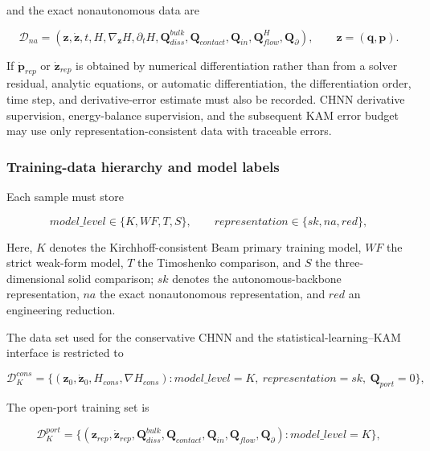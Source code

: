and the exact nonautonomous data are

\begin{equation}
\label{eq:galerkin-2-122}
\mathcal{D}_{na} = \left( \mathbf{z},\dot{\mathbf{z}},t,H,\nabla_{\mathbf{z}}H,\partial_{t}H,\mathbf{Q}_{diss}^{bulk},\mathbf{Q}_{contact},\mathbf{Q}_{in},\mathbf{Q}_{flow}^{H},\mathbf{Q}_{\partial} \right),\quad\quad\mathbf{z} = \left( \mathbf{q},\mathbf{p} \right).
\end{equation}

If \({\dot{\mathbf{p}}}_{rep}\) or \({\dot{\mathbf{z}}}_{rep}\) is obtained by numerical differentiation rather than from a solver residual, analytic equations, or automatic differentiation, the differentiation order, time step, and derivative-error estimate must also be recorded. CHNN derivative supervision, energy-balance supervision, and the subsequent KAM error budget may use only representation-consistent data with traceable errors.

\subsubsection{Training-data hierarchy and model labels}\label{sec:galerkin-2-11-3}

Each sample must store

\begin{equation}
\label{eq:galerkin-2-123}
model\_ level \in \{ K,WF,T,S\},\quad\quad representation \in \{ sk,na,red\},
\end{equation}

Here, \(K\) denotes the Kirchhoff-consistent Beam primary training model, \(WF\) the strict weak-form model, \(T\) the Timoshenko comparison, and \(S\) the three-dimensional solid comparison; \(sk\) denotes the autonomous-backbone representation, \(na\) the exact nonautonomous representation, and \(red\) an engineering reduction.

The data set used for the conservative CHNN and the statistical-learning--KAM interface is restricted to

\begin{equation}
\label{eq:galerkin-2-124}
\mathcal{D}_{K}^{cons} = \{\left( \mathbf{z}_{0},{\dot{\mathbf{z}}}_{0},H_{cons},\nabla H_{cons} \right):model\_ level = K,\ representation = sk,\ \mathbf{Q}_{port} = 0\},
\end{equation}

The open-port training set is

\begin{equation}
\label{eq:galerkin-2-125}
\mathcal{D}_{K}^{port} = \{\left( \mathbf{z}_{rep},{\dot{\mathbf{z}}}_{rep},\mathbf{Q}_{diss}^{bulk},\mathbf{Q}_{contact},\mathbf{Q}_{in},\mathbf{Q}_{flow},\mathbf{Q}_{\partial} \right):model\_ level = K\},
\end{equation}

